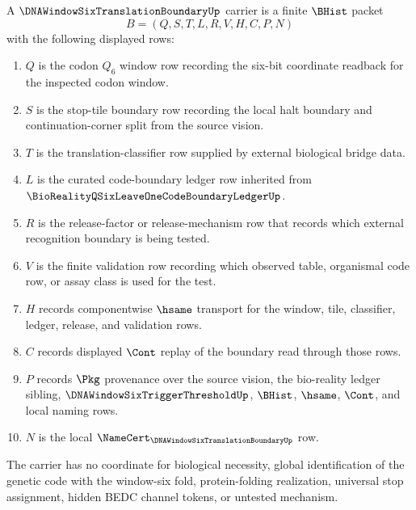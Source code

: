 \begin{definition}
\label{def:dna-window-six-translation-boundary-carrier}
A $\DNAWindowSixTranslationBoundaryUp$ carrier is a finite $\BHist$ packet
$$
B=(Q,S,T,L,R,V,H,C,P,N)
$$
with the following displayed rows:
\begin{enumerate}
\item $Q$ is the codon $Q_{6}$ window row recording the six-bit coordinate readback for the inspected codon window.
\item $S$ is the stop-tile boundary row recording the local halt boundary and continuation-corner split from the source vision.
\item $T$ is the translation-classifier row supplied by external biological bridge data.
\item $L$ is the curated code-boundary ledger row inherited from $\BioRealityQSixLeaveOneCodeBoundaryLedgerUp$.
\item $R$ is the release-factor or release-mechanism row that records which external recognition boundary is being tested.
\item $V$ is the finite validation row recording which observed table, organismal code row, or assay class is used for the test.
\item $H$ records componentwise $\hsame$ transport for the window, tile, classifier, ledger, release, and validation rows.
\item $C$ records displayed $\Cont$ replay of the boundary read through those rows.
\item $P$ records $\Pkg$ provenance over the source vision, the bio-reality ledger sibling, $\DNAWindowSixTriggerThresholdUp$, $\BHist$, $\hsame$, $\Cont$, and local naming rows.
\item $N$ is the local $\NameCert_{\DNAWindowSixTranslationBoundaryUp}$ row.
\end{enumerate}
The carrier has no coordinate for biological necessity, global identification of the genetic code with the window-six fold, protein-folding realization, universal stop assignment, hidden BEDC channel tokens, or untested mechanism.
\end{definition}

